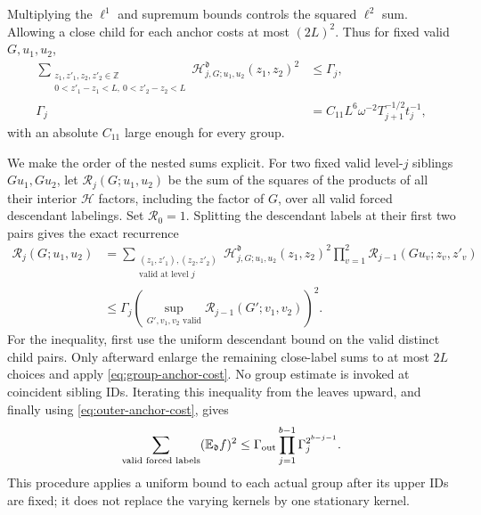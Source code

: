 Multiplying the $\ell^1$ and supremum bounds controls the squared $\ell^2$ sum.  Allowing a close child for each anchor costs at most $(2L)^2$.  Thus for fixed valid $G,u_1,u_2$,
\begin{equation}\label{eq:group-anchor-cost}
\begin{aligned}
 \sum_{\substack{z_1,z'_1,z_2,z'_2\in\mathbb Z\\
                  0<z'_1-z_1<L,\ 0<z'_2-z_2<L}}
       \mathcal H_{j,G;u_1,u_2}^{\mathfrak d}(z_1,z_2)^2
 &\le\Gamma_j,\\
 \Gamma_j&=C_{11}L^6\omega^{-2}T_{j+1}^{-1/2}t_j^{-1},
\end{aligned}
\end{equation}
with an absolute $C_{11}$ large enough for every group.

We make the order of the nested sums explicit.  For two fixed valid level-$j$ siblings $Gu_1,Gu_2$, let $\mathcal R_j(G;u_1,u_2)$ be the sum of the squares of the products of all their interior $\mathcal H$ factors, including the factor of $G$, over all valid forced descendant labelings.  Set $\mathcal R_0=1$.  Splitting the descendant labels at their first two pairs gives the exact recurrence
\begin{equation}\label{eq:anchor-sum-recursion}
\begin{aligned}
 \mathcal R_j(G;u_1,u_2)
 &=\sum_{\substack{(z_1,z'_1),(z_2,z'_2)\\
                    \text{valid at level }j}}
 \mathcal H_{j,G;u_1,u_2}^{\mathfrak d}(z_1,z_2)^2
 \prod_{v=1}^2\mathcal R_{j-1}(Gu_v;z_v,z'_v)\\
 &\le \Gamma_j\left(\sup_{G',v_1,v_2\text{ valid}}\mathcal R_{j-1}(G';v_1,v_2)\right)^2.
\end{aligned}
\end{equation}
For the inequality, first use the uniform descendant bound on the valid distinct child pairs.  Only afterward enlarge the remaining close-label sums to at most $2L$ choices and apply \eqref{eq:group-anchor-cost}.  No group estimate is invoked at coincident sibling IDs.  Iterating this inequality from the leaves upward, and finally using \eqref{eq:outer-anchor-cost}, gives
\begin{equation}\label{eq:forced-anchor-sum}
 \sum_{\text{valid forced labels}}(\mathbb E_{\mathfrak d}f)^2
 \le \Gamma_{\rm out}\prod_{j=1}^{b-1}\Gamma_j^{2^{b-j-1}}.
\end{equation}
This procedure applies a uniform bound to each actual group after its upper IDs are fixed; it does not replace the varying kernels by one stationary kernel.

